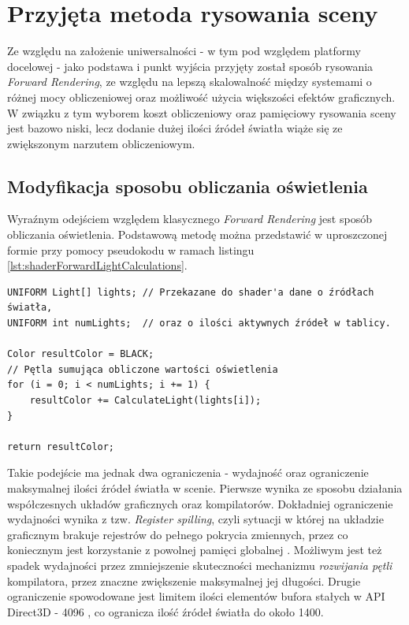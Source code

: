 \chapter{Przyjęta metoda rysowania sceny}
\label{ChapterSceneDrawingMethod}
	Ze względu na założenie uniwersalności - w tym pod względem platformy docelowej - jako podstawa i punkt wyjścia przyjęty został sposób rysowania \textit{Forward Rendering}, ze względu na lepszą skalowalność między systemami o różnej mocy obliczeniowej oraz możliwość użycia większości efektów graficznych. W związku z tym wyborem koszt obliczeniowy oraz pamięciowy rysowania sceny jest bazowo niski, lecz dodanie dużej ilości źródeł światła wiąże się ze zwiększonym narzutem obliczeniowym.
	
\section{Modyfikacja sposobu obliczania oświetlenia}
	Wyraźnym odejściem względem klasycznego \textit{Forward Rendering} jest sposób obliczania oświetlenia. Podstawową metodę można przedstawić w uproszczonej formie przy pomocy pseudokodu w ramach listingu \ref{lst:shaderForwardLightCalculations}.
	
	\begin{lstlisting}[caption={Pseudokod programu cieniującego obliczającego oświetlenie metodą Forward Rendering}, label={lst:shaderForwardLightCalculations}]
UNIFORM Light[] lights; // Przekazane do shader'a dane o źródłach światła,
UNIFORM int numLights;  // oraz o ilości aktywnych źródeł w tablicy.
		
Color resultColor = BLACK;
// Pętla sumująca obliczone wartości oświetlenia
for (i = 0; i < numLights; i += 1) {
    resultColor += CalculateLight(lights[i]);
}

return resultColor; 
	\end{lstlisting}
	
	Takie podejście ma jednak dwa ograniczenia - wydajność oraz ograniczenie maksymalnej ilości źródeł światła w scenie.	Pierwsze wynika ze sposobu działania współczesnych układów graficznych oraz kompilatorów. Dokładniej ograniczenie wydajności wynika z tzw. \textit{Register spilling}, czyli sytuacji w której na układzie graficznym brakuje rejestrów do pełnego pokrycia zmiennych, przez co koniecznym jest korzystanie z powolnej pamięci globalnej \cite{amd:gpuopen:RegisterSpilling}. Możliwym jest też spadek wydajności przez zmniejszenie skuteczności mechanizmu \textit{rozwijania pętli} kompilatora, przez znaczne zwiększenie maksymalnej jej długości. Drugie ograniczenie spowodowane jest limitem ilości elementów bufora stałych w API Direct3D - 4096 \cite{microsoft:Direct3D11:ResourceLimits}, co ogranicza ilość źródeł światła do około 1400. 
	
